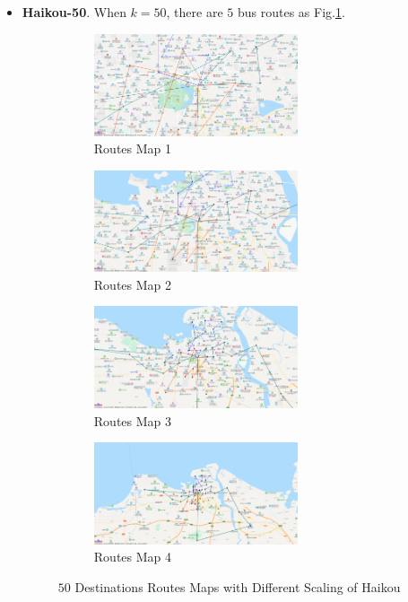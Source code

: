 \documentclass{llncs}
\begin{document}
\begin{itemize}
	\item \textbf{Haikou-50}. When $k=50$, there are $5$ bus routes as Fig.\ref{fig-hk-50}.
	
	\begin{figure}[htbp]
		\centering
		\begin{subfigure}[t]{0.45\textwidth}
			\begin{minipage}{6cm}
				\centering
				\includegraphics[width=6cm]{figures/hk_50_1.png}
				\caption{Routes Map 1}
			\end{minipage}%
		\end{subfigure}
		\begin{subfigure}[t]{0.45\textwidth}
			\begin{minipage}{6cm}
				\centering
				\includegraphics[width=6cm]{figures/hk_50_2.png}
				\caption{Routes Map 2}
			\end{minipage}
		\end{subfigure}
		\begin{subfigure}[t]{0.45\textwidth}
			\begin{minipage}{6cm}
				\centering
				\includegraphics[width=6cm]{figures/hk_50_3.png}
				\caption{Routes Map 3}
			\end{minipage}%
		\end{subfigure}
		\begin{subfigure}[t]{0.45\textwidth}
			\begin{minipage}{6cm}
				\centering
				\includegraphics[width=6cm]{figures/hk_50_4.png}
				\caption{Routes Map 4}
			\end{minipage}
		\end{subfigure}
		\caption{$50$ Destinations Routes Maps with Different Scaling of Haikou}
		\label{fig-hk-50}
	\end{figure}
\end{itemize}
\end{document}
